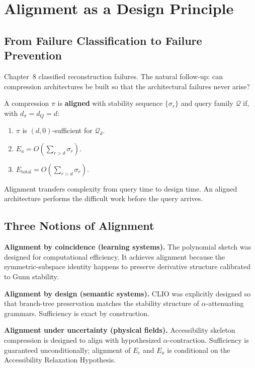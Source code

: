 \chapter{Alignment as a Design Principle}

\section{From Failure Classification to Failure Prevention}

Chapter~8 classified reconstruction failures. The natural follow-up: can compression architectures be built so that the architectural failures never arise?

\begin{definition}
A compression $\pi$ is \textbf{aligned} with stability sequence $\{\sigma_r\}$ and query family $\mathcal{Q}$ if, with $d_\pi = d_Q = d$:
\begin{enumerate}
  \item $\pi$ is $(d, 0)$-sufficient for $\mathcal{Q}_d$.
  \item $E_a = O(\sum_{r>d} \sigma_r)$.
  \item $E_{\mathrm{total}} = O(\sum_{r>d} \sigma_r)$.
\end{enumerate}
\end{definition}

Alignment transfers complexity from query time to design time. An aligned architecture performs the difficult work before the query arrives.

\section{Three Notions of Alignment}

\textbf{Alignment by coincidence (learning systems).} The polynomial sketch was designed for computational efficiency. It achieves alignment because the symmetric-subspace identity happens to preserve derivative structure calibrated to Gunn stability.

\textbf{Alignment by design (semantic systems).} CLIO was explicitly designed so that branch-tree preservation matches the stability structure of $\alpha$-attenuating grammars. Sufficiency is exact by construction.

\textbf{Alignment under uncertainty (physical fields).} Accessibility skeleton compression is designed to align with hypothesized $\alpha$-contraction. Sufficiency is guaranteed unconditionally; alignment of $E_c$ and $E_a$ is conditional on the Accessibility Relaxation Hypothesis.

